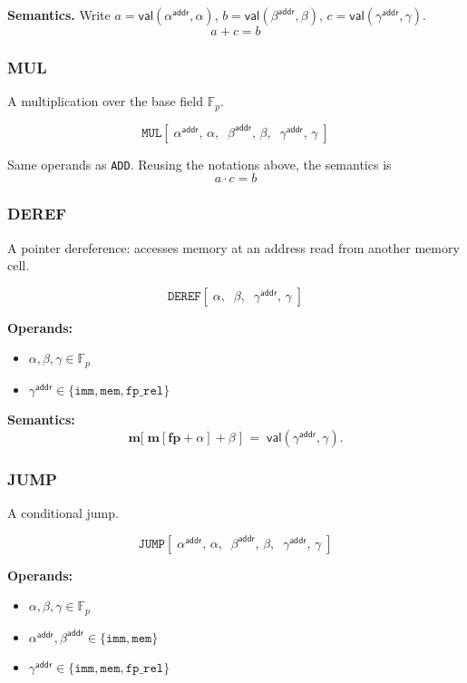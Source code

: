 \documentclass{article}
\theoremstyle{definition}
\newcommand{\Fp}{\mathbb F_p}
\begin{document}
\textbf{Semantics.} Write $a = \mathsf{val}(\alpha^\textsf{addr}, \alpha)$, $b = \mathsf{val}(\beta^\textsf{addr}, \beta)$, $c = \mathsf{val}(\gamma^\textsf{addr}, \gamma)$.
\[
a + c = b
\]

\subsubsection{MUL}

A multiplication over the base field $\Fp$.

\[
\texttt{MUL}[\;\alpha^\textsf{addr},\, \alpha,\;\; \beta^\textsf{addr},\, \beta,\;\; \gamma^\textsf{addr},\, \gamma\;]
\]

Same operands as \texttt{ADD}. Reusing the notations above, the semantics is
\[
a \cdot c = b
\]



\subsubsection{DEREF}

A pointer dereference: accesses memory at an address read from another memory cell.

\[
\texttt{DEREF}[\;\alpha,\;\; \beta,\;\; \gamma^\textsf{addr},\, \gamma\;]
\]

\textbf{Operands:}
\begin{itemize}
    \item $\alpha, \beta, \gamma \in \Fp$
    \item $\gamma^\textsf{addr} \in \{\texttt{imm}, \texttt{mem}, \texttt{fp\_rel}\}$
\end{itemize}

\textbf{Semantics:}
\[
\textbf{m}\big[\;\textbf{m}[\textbf{fp} + \alpha] + \beta\;\big] \;=\; \mathsf{val}(\gamma^\textsf{addr}, \gamma).
\]

\subsubsection{JUMP} \label{sec:jump}

A conditional jump.

\[
\texttt{JUMP}[\;\alpha^\textsf{addr},\, \alpha,\;\; \beta^\textsf{addr},\, \beta,\;\; \gamma^\textsf{addr},\, \gamma\;]
\]

\textbf{Operands:}
\begin{itemize}
    \item $\alpha, \beta, \gamma \in \Fp$
    \item $\alpha^\textsf{addr}, \beta^\textsf{addr} \in \{\texttt{imm}, \texttt{mem}\}$
    \item $\gamma^\textsf{addr} \in \{\texttt{imm}, \texttt{mem}, \texttt{fp\_rel}\}$
\end{itemize}
\end{document}
